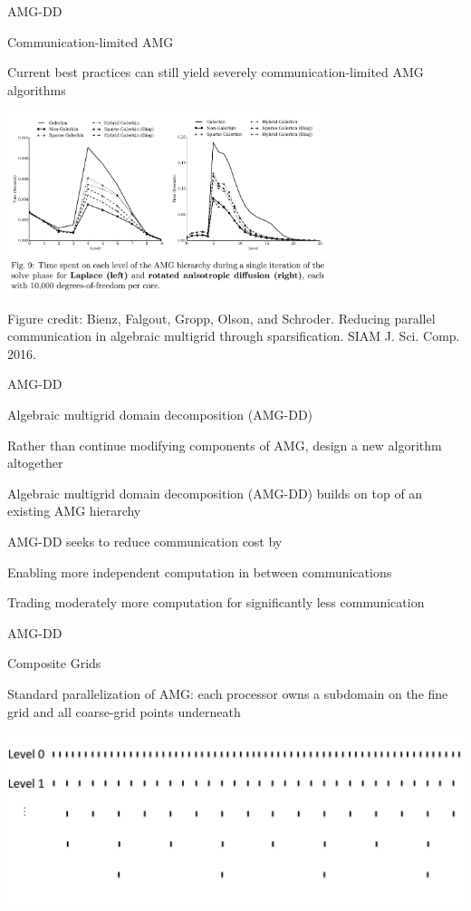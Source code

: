 \documentclass[18pt,xcolor=table]{beamer}
\begin{document}
\begin{frame}{AMG-DD}
\begin{block}{Communication-limited AMG}
\bit
\item Current best practices can still yield severely communication-limited AMG algorithms
\eit
\end{block}
\begin{center}
\includegraphics[width=0.7\textwidth]{../figures/nonGalerkinFigure}
\end{center}
\tiny{Figure credit: Bienz, Falgout, Gropp, Olson, and Schroder. Reducing parallel communication in algebraic multigrid through sparsification. SIAM J. Sci. Comp. 2016.}
\end{frame}

\begin{frame}{AMG-DD}
\begin{block}{Algebraic multigrid domain decomposition (AMG-DD)}
\bit
\item Rather than continue modifying components of AMG, design a new algorithm altogether
\item Algebraic multigrid domain decomposition (AMG-DD) builds on top of an existing AMG hierarchy
\item AMG-DD seeks to reduce communication cost by
\bit
\item Enabling more independent computation in between communications
\item Trading moderately more computation for significantly less communication
\eit
\eit
\end{block}
\end{frame}

\begin{frame}{AMG-DD}
\begin{block}{Composite Grids}
\bit
\item Standard parallelization of AMG: each processor owns a subdomain on the fine grid and all coarse-grid points underneath
\eit
\end{block}
\centering
\includegraphics[width=\textwidth]{../figures/compGridCreation1D1}
\end{frame}
\end{document}
